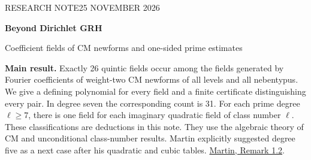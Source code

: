 \documentclass[10pt,letterpaper]{article}
\begin{document}
\thispagestyle{plain}
{\sffamily\small\color{accent} RESEARCH NOTE\hfill 25 NOVEMBER 2026}\par\vspace{.8em}
{\sffamily\bfseries\LARGE\color{ink} Beyond Dirichlet GRH}\par\vspace{.4em}
{\Large Coefficient fields of CM newforms and one-sided prime estimates}\par\vspace{.9em}
\noindent\textbf{Main result.}
Exactly 26 quintic fields occur among the fields generated by Fourier coefficients
of weight-two CM newforms of all levels and all nebentypus. We give a defining
polynomial for every field and a finite certificate distinguishing every pair.
In degree seven the corresponding count is 31. For each prime degree
$\ell\ge7$, there is one field for each imaginary quadratic field of class number
$\ell$. These classifications are deductions in this note. They use the
algebraic theory of CM and unconditional class-number results. Martin explicitly
suggested degree five as a next case after his quadratic and cubic tables.
\href{https://arxiv.org/html/2509.24119v2}{Martin, Remark 1.2}.
\end{document}
